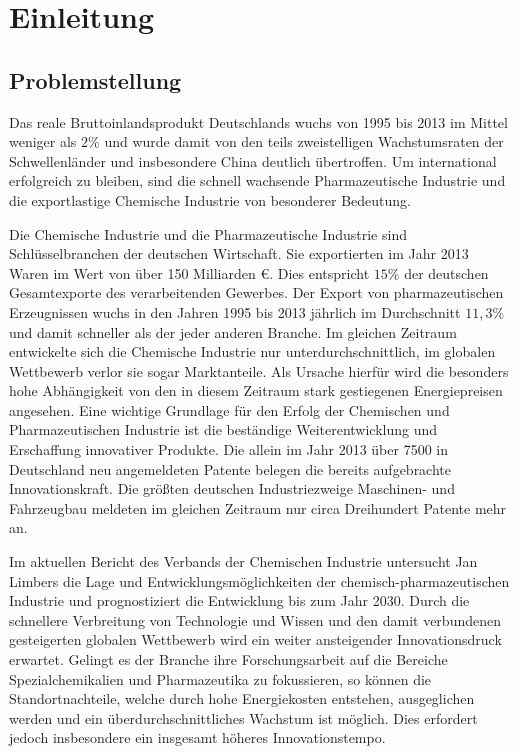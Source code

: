 \chapter{Einleitung}\label{ch:einleitung}
\section{Problemstellung}
Das reale Bruttoinlandsprodukt Deutschlands wuchs von 1995 bis 2013 im Mittel weniger als $2\%$ und wurde damit von den teils zweistelligen Wachstumsraten der Schwellenl\"ander und insbesondere China deutlich \"ubertroffen. Um international erfolgreich zu bleiben, sind die schnell wachsende Pharmazeutische Industrie und die exportlastige Chemische Industrie von besonderer Bedeutung. \hfill \newline

Die Chemische Industrie und die Pharmazeutische Industrie sind Schl\"usselbranchen der deutschen Wirtschaft. Sie exportierten im Jahr 2013 Waren im Wert von \"uber 150 Milliarden \euro. Dies entspricht $15 \%$ der deutschen Gesamtexporte des verarbeitenden Gewerbes. Der Export von pharmazeutischen Erzeugnissen wuchs in den Jahren 1995 bis 2013 j\"ahrlich im Durchschnitt $11,3 \%$ und damit schneller als der jeder anderen Branche. Im gleichen Zeitraum entwickelte sich die Chemische Industrie nur unterdurchschnittlich, im globalen Wettbewerb verlor sie sogar Marktanteile. Als Ursache hierf\"ur wird die besonders hohe Abh\"angigkeit von den in diesem Zeitraum stark gestiegenen Energiepreisen angesehen. \hfill \newline
Eine wichtige Grundlage f\"ur den Erfolg der Chemischen und Pharmazeutischen Industrie ist die best\"andige Weiterentwicklung und Erschaffung innovativer Produkte. Die allein im Jahr 2013 \"uber 7500 in Deutschland neu angemeldeten Patente belegen die bereits aufgebrachte Innovationskraft. Die gr\"o\ss{}ten deutschen Industriezweige Maschinen- und Fahrzeugbau meldeten im gleichen Zeitraum nur circa Dreihundert Patente mehr an. \cite{PerspektiveD_2016} \hfill \newline

Im aktuellen Bericht des Verbands der Chemischen Industrie  untersucht Jan Limbers die Lage und Entwicklungsm\"oglichkeiten der chemisch-pharmazeutischen Industrie und prognostiziert die Entwicklung bis zum Jahr 2030. Durch die schnellere Verbreitung von Technologie und Wissen und den damit verbundenen gesteigerten globalen Wettbewerb wird ein weiter ansteigender Innovationsdruck erwartet. Gelingt es der Branche ihre Forschungsarbeit auf die Bereiche Spezialchemikalien und Pharmazeutika zu fokussieren, so k\"onnen die Standortnachteile, welche durch hohe Energiekosten entstehen, ausgeglichen werden und ein \"uberdurchschnittliches Wachstum ist m\"oglich. Dies erfordert jedoch insbesondere ein insgesamt h\"oheres Innovationstempo. \cite{PerspektiveC_2016} \hfill \newline

